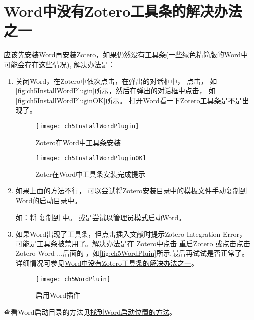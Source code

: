 \documentclass[cn,11pt,chinese]{elegantbook}
\begin{document}
    	\section{Word中没有Zotero工具条的解决办法之一}\label{sec:tool_bar}
	    	应该先安装Word再安装Zotero，如果仍然没有工具条(一些绿色精简版的Word中可能会存在这些情况),	    	
			解决办法是：
			\begin{enumerate}
				\item 关闭Word，在Zotero中依次点击，在弹出的对话框中，
				点击，
				如\autoref{fig:ch5InstallWordPlugin}所示，然后在弹出的对话框中点击，
				如\autoref{fig:ch5InstallWordPluginOK}所示。
				打开Word看一下Zotero工具条是不是出现了。
			 
						\begin{figure}[htbp]
							\centering
							\texttt{[image: ch5InstallWordPlugin]}
							\caption{Zotero在Word中工具条安装}
							\label{fig:ch5InstallWordPlugin}
							\end{figure}
						
						\begin{figure}[htbp]
							\centering
							\texttt{[image: ch5InstallWordPluginOK]}
							\caption{Zoter在Word中工具条安装完成提示}
							\label{fig:ch5InstallWordPluginOK}
							\end{figure}
				\item 如果上面的方法不行，
			可以尝试将Zotero安装目录中的模板文件手动复制到Word的启动目录中。
	    	
			如：将
			复制到 
			中。
			或是尝试以管理员模式启动Word。
	    		
			   \item 如果Word出现了工具条，但点击插入文献时提示Zotero Integration Error，
			   可能是工具条被禁用了。解决办法是在
			   Zotero中点击 重启Zotero
			   或点击点击Zotero Word ...后面的 
			   ，如\autoref{fig:ch5WordPluin}所示,最后再试试是否正常了。
			   详细情况可参见\href{https://zhuanlan.zhihu.com/p/58931999}
			   {Word中没有Zotero工具条的解决办法之一}。
		    		\begin{figure}[htbp]
		    				\centering
		    				\texttt{[image: ch5WordPluin]}
		    				\caption{启用Word插件}
		    				\label{fig:ch5WordPluin}
		    		\end{figure}	
			\end{enumerate}
				查看Word启动目录的方法见\href{https://zhuanlan.zhihu.com/p/85513418}
				{找到Word启动位置的方法}。
		
\end{document}
